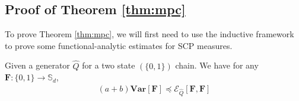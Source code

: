 \subsection{Proof of Theorem \ref{thm:mpc}}
To prove Theorem \ref{thm:mpc}, we will first need to use the inductive framework to prove some functional-analytic estimates for SCP measures.
  \begin{lemma}\label{lem:2stPI} Given a generator $\hat{Q}$ for a two state $(\{ 0,1\})$ chain. We have for any $\mathbf{F}:\{ 0,1\}\rightarrow \mathbb{S}_d$,
    \begin{align*}
      (a+b)\mathbf{Var}[\mathbf{F}]\preceq \mathcal{E}_{\hat{Q}}[\mathbf{F},\mathbf{F}]
    \end{align*}
  \end{lemma}
